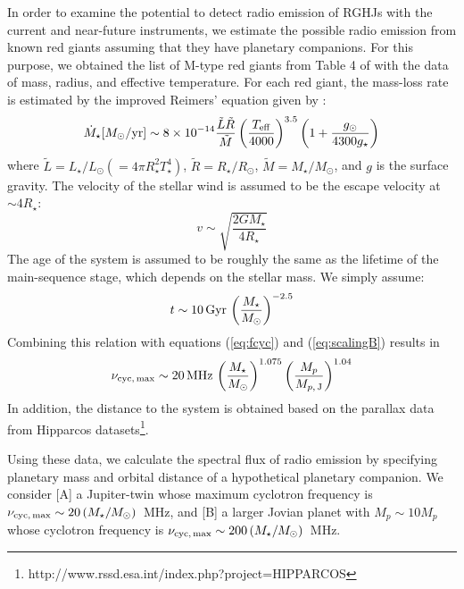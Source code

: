 \documentclass[iop,numberedappendix,apj]{emulateapj}
\begin{document}
In order to examine the potential to detect radio emission of RGHJs with the current and near-future instruments, we estimate the possible radio emission from known red giants assuming that they have planetary companions. 
For this purpose, we obtained the list of M-type red giants from Table 4 of \citet{dumm1998} with the data of mass, radius, and effective temperature.
For each red giant, the mass-loss rate is estimated by the improved Reimers' equation \citep{reimers1975} given by \citet{schroder2005,schroder2007}:
\begin{equation}
\dot M_\star [M_\odot{\rm /yr}] \sim 8 \times 10^{-14} \frac{\tilde L \tilde R}{\tilde M} \left( \frac{T_{\rm eff}}{4000} \right)^{3.5} \left( 1 + \frac{g_{\odot }}{4300 g_{\star}} \right) \label{eq:mass-loss}
\end{equation}
where $\tilde L = L_{\star }/L_{\odot }(=4\pi R_{\star }^2 T_{\star }^4)$, $\tilde R = R_{\star }/R_{\odot }$, $\tilde M = M_{\star }/M_{\odot }$, and $g$ is the surface gravity. 
The velocity of the stellar wind is assumed to be the escape velocity at $\sim 4 R_{\star }$:
\begin{equation}
v \sim \sqrt{\frac{2GM_\star}{4R_{\star }}}
\end{equation}
The age of the system is assumed to be roughly the same as the lifetime of the main-sequence stage, which depends on the stellar mass. We simply assume:
\begin{equation}
t \sim 10\,{\rm Gyr}\, \left( \frac{M_{\star}}{M_{\odot }} \right)^{-2.5}
\end{equation}
Combining this relation with equations (\ref{eq:fcyc}) and (\ref{eq:scalingB}) results in
\begin{equation}
\nu_{\rm cyc,\,max} \sim 20 \,{\rm MHz}\, \left( \frac{M_{\star}}{M_{\odot }} \right)^{1.075} \left( \frac{M_p}{M_{p,\,{\rm J}}} \right)^{1.04} 
\end{equation}
In addition, the distance to the system is obtained based on the parallax data from Hipparcos datasets\footnote{http://www.rssd.esa.int/index.php?project=HIPPARCOS}.

Using these data, we calculate the spectral flux of radio emission by specifying planetary mass and orbital distance of a hypothetical planetary companion. 
We consider [A] a Jupiter-twin whose maximum cyclotron frequency is $\nu _{\rm cyc,\,max} \sim 20\,(M_{\star }/M_{\odot})$~MHz, and [B] a larger Jovian planet with $M_p\sim 10M_p$ whose cyclotron frequency is $\nu _{\rm cyc,\,max} \sim 200\,(M_{\star }/M_{\odot})$~MHz. 
\end{document}
